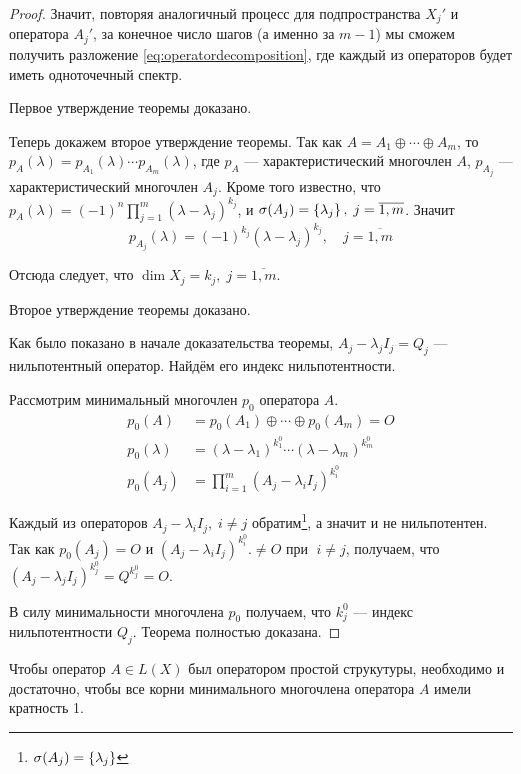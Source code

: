 \begin{proof}
    Значит, повторяя аналогичный процесс для подпространства $X_j'$ и оператора
    $A_j'$, за конечное число шагов (а именно за $m-1$) мы сможем получить разложение
    \eqref{eq:operatordecomposition}, где каждый из операторов будет иметь
    одноточечный спектр.

    Первое утверждение теоремы доказано.

    Теперь докажем второе утверждение теоремы.
    Так как $A = A_1 \oplus \dotsb \oplus A_m$, то
    $p_A(\lambda) = p_{A_1}(\lambda)\dotsm p_{A_m}(\lambda)$, где $p_A$ —
    характеристический многочлен $A$, $p_{A_j}$ — характеристический многочлен
    $A_j$. Кроме того известно, что $p_A(\lambda) = (-1)^n
    \prod\limits_{j=1}^m(\lambda - \lambda_j)^{k_j}$, и $\operatorname{\sigma}(A_j) =
    \left\{\lambda_j\right\}, \; j = \overline{1,m}$. Значит
    \[ p_{A_j}(\lambda) = (-1)^{k_j} (\lambda - \lambda_j)^{k_j}, \quad j =
        \overline{1,m} \]

    Отсюда следует, что $\dim X_j = k_j, \; j = \overline{1,m}$. 
    
    Второе утверждение теоремы доказано.

    Как было показано в начале доказательства теоремы, 
    $A_j - \lambda_j I_j = Q_j$ — нильпотентный оператор.
    Найдём его индекс нильпотентности.

    Рассмотрим минимальный многочлен $p_0$ оператора $A$.
    \begin{align*}
        p_0(A) &= p_0(A_1) \oplus \dotsb \oplus p_0(A_m) = O \\
        p_0(\lambda) &= (\lambda - \lambda_1)^{k_1^0} \dotsm
        (\lambda-\lambda_m)^{k_m^0} \\
        p_0(A_j) &= \prod_{i=1}^m (A_j - \lambda_i I_j)^{k_i^0}
    \end{align*}

    Каждый из операторов $A_j - \lambda_i I_j, \; i \neq j$ обратим\footnote{
        $\operatorname{\sigma}(A_j) = \left\{\lambda_j\right\}$}, а значит и не нильпотентен. Так как
        $p_0(A_j) = O$ и $(A_j -\lambda_i I_j)^{k_i^0}. \neq O \text{ при } \; i \neq j$,
        получаем, что $(A_j - \lambda_j I_j)^{k_j^0} = Q^{k_j^0} = O$.

    В силу минимальности многочлена $p_0$ получаем, что $k_j^0$ — индекс
    нильпотентности $Q_j$. Теорема полностью доказана.
\end{proof}

\begin{theorem}
    Чтобы оператор $A\in L(X)$ был оператором простой струкутуры, необходимо и
    достаточно, чтобы все корни минимального многочлена оператора $A$ имели
    кратность 1.
\end{theorem}

